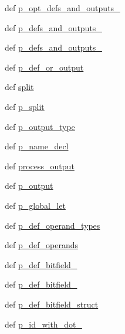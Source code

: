 \begin{DoxyCompactItemize}
\item 
def \hyperlink{classisa__parser_1_1ISAParser_a66c65954e1db9ce43456d60351f70871}{p\_\-opt\_\-defs\_\-and\_\-outputs\_}
\item 
def \hyperlink{classisa__parser_1_1ISAParser_a71c1d6db62003c725d53d9b25ccea6f0}{p\_\-defs\_\-and\_\-outputs\_}
\item 
def \hyperlink{classisa__parser_1_1ISAParser_a8ce860f7017c611dff7546dfcb75eba9}{p\_\-defs\_\-and\_\-outputs\_}
\item 
def \hyperlink{classisa__parser_1_1ISAParser_aee60b0ae213167ea6100bc4bea915eaf}{p\_\-def\_\-or\_\-output}
\item 
def \hyperlink{classisa__parser_1_1ISAParser_aa1b3eb766e0ce403f657d75fa4965fa3}{split}
\item 
def \hyperlink{classisa__parser_1_1ISAParser_aa8f605e6c66c7d30e22e84eeca9724a8}{p\_\-split}
\item 
def \hyperlink{classisa__parser_1_1ISAParser_a7bda0086bf18eba339523d4f905e4368}{p\_\-output\_\-type}
\item 
def \hyperlink{classisa__parser_1_1ISAParser_a222c1fd8a739fac33949a4a1b8162324}{p\_\-name\_\-decl}
\item 
def \hyperlink{classisa__parser_1_1ISAParser_af46185830bf6fe9b86d027a8c0c640c2}{process\_\-output}
\item 
def \hyperlink{classisa__parser_1_1ISAParser_a0911fee7692e9b45fd460b83a2d07727}{p\_\-output}
\item 
def \hyperlink{classisa__parser_1_1ISAParser_a29a462b6dec44ad37ff080fa27bda345}{p\_\-global\_\-let}
\item 
def \hyperlink{classisa__parser_1_1ISAParser_a8ccd4be07d1f45274f007765fff0f0ea}{p\_\-def\_\-operand\_\-types}
\item 
def \hyperlink{classisa__parser_1_1ISAParser_a614c3107873cf2c178233b051b8c48bc}{p\_\-def\_\-operands}
\item 
def \hyperlink{classisa__parser_1_1ISAParser_a090c7359fa45ffd50a877ab89a811ff1}{p\_\-def\_\-bitfield\_}
\item 
def \hyperlink{classisa__parser_1_1ISAParser_a9f258c630a4f9a44f5581f8f3573e8d8}{p\_\-def\_\-bitfield\_}
\item 
def \hyperlink{classisa__parser_1_1ISAParser_ab59be3fb9420545e7d3bc02e47af99e9}{p\_\-def\_\-bitfield\_\-struct}
\item 
def \hyperlink{classisa__parser_1_1ISAParser_afb4323ab4dbe951856c57df317316421}{p\_\-id\_\-with\_\-dot\_}
\item 

\end{DoxyCompactItemize}
